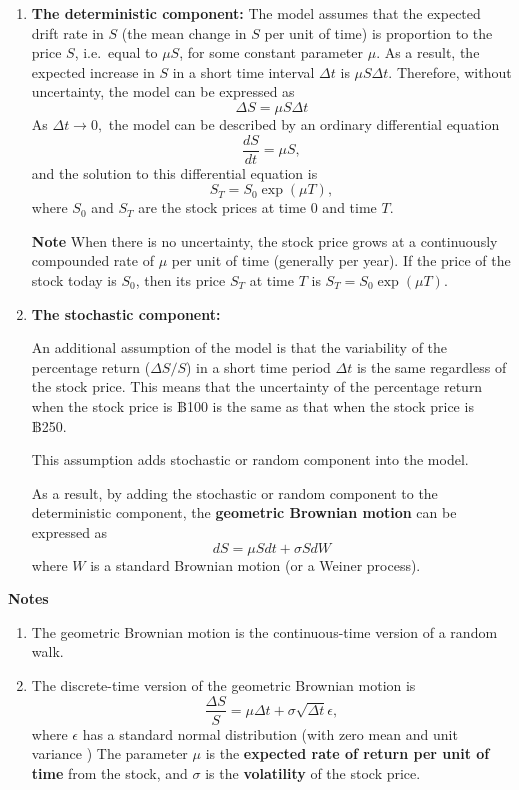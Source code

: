 \documentclass[
]{book}
\theoremstyle{definition}
\theoremstyle{definition}
\theoremstyle{definition}
\theoremstyle{definition}
\theoremstyle{remark}
\begin{document}
\begin{enumerate}
\def\labelenumi{\arabic{enumi}.}
\item
  \textbf{The deterministic component:} The model assumes that the expected
  drift rate in \(S\) (the mean change in \(S\) per unit of time) is
  proportion to the price \(S\), i.e.~equal to \(\mu S\), for some
  constant parameter \(\mu\). As a result, the expected increase in \(S\)
  in a short time interval \(\Delta t\) is \(\mu S \Delta t\). Therefore,
  without uncertainty, the model can be expressed as
  \[\Delta S = \mu S \Delta t\] As \(\Delta t \rightarrow 0,\) the model
  can be described by an ordinary differential equation
  \[\frac{dS}{dt} = \mu S,\] and the solution to this differential
  equation is \[S_{T} = S_0 \exp(\mu T),\] where \(S_0\) and \(S_T\) are
  the stock prices at time 0 and time \(T\).

  \textbf{Note} When there is no uncertainty, the stock price grows at a
  continuously compounded rate of \(\mu\) per unit of time (generally
  per year). If the price of the stock today is \(S_0\), then its price
  \(S_T\) at time \(T\) is \(S_{T} = S_0 \exp(\mu T)\).
\item
  \textbf{The stochastic component:}

  An additional assumption of the model is that the variability of the
  percentage return (\(\Delta S/S\)) in a short time period \(\Delta t\)
  is the same regardless of the stock price. This means that the
  uncertainty of the percentage return when the stock price is ฿100 is
  the same as that when the stock price is ฿250.

  This assumption adds stochastic or random component into the model.

  As a result, by adding the stochastic or random component to the
  deterministic component, the \textbf{geometric Brownian motion} can be
  expressed as \[dS = \mu S dt + \sigma S dW\] where \(W\) is a standard
  Brownian motion (or a Weiner process).
\end{enumerate}

\textbf{Notes}

\begin{enumerate}
\def\labelenumi{\arabic{enumi}.}
\item
  The geometric Brownian motion is the continuous-time version of a
  random walk.
\item
  The discrete-time version of the geometric Brownian motion is
  \[\frac{\Delta S}{S} = \mu \Delta t + \sigma \sqrt{\Delta t} \epsilon,\]
  where \(\epsilon\) has a standard normal distribution (with zero mean
  and unit variance ) The parameter \(\mu\) is the \textbf{expected rate of
  return per unit of time} from the stock, and \(\sigma\) is the
  \textbf{volatility} of the stock price.
\end{enumerate}
\end{document}
